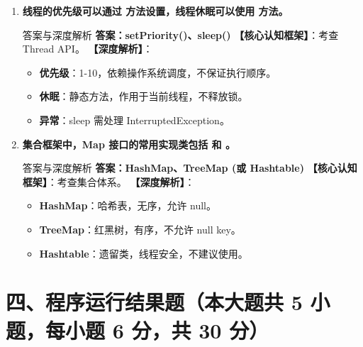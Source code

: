 \documentclass[12pt, a4paper]{ctexart}
\newcommand{\blank}{\underline{\hspace{2cm}}}
\begin{document}
\begin{enumerate}[label=\arabic*.]
	\item \textbf{线程的优先级可以通过 \blank 方法设置，线程休眠可以使用 \blank 方法。}
	      \begin{bluebox}{答案与深度解析}
		      \textbf{答案：setPriority()、sleep()}
		      \textbf{【核心认知框架】}：考查 Thread API。
		      \textbf{【深度解析】}：
		      \begin{itemize}[leftmargin=*, nosep]
			      \item \textbf{优先级}：1-10，依赖操作系统调度，不保证执行顺序。
			      \item \textbf{休眠}：静态方法，作用于当前线程，不释放锁。
			      \item \textbf{异常}：sleep 需处理 InterruptedException。
		      \end{itemize}
	      \end{bluebox}

	\item \textbf{集合框架中，Map 接口的常用实现类包括 \blank 和 \blank。}
	      \begin{bluebox}{答案与深度解析}
		      \textbf{答案：HashMap、TreeMap (或 Hashtable)}
		      \textbf{【核心认知框架】}：考查集合体系。
		      \textbf{【深度解析】}：
		      \begin{itemize}[leftmargin=*, nosep]
			      \item \textbf{HashMap}：哈希表，无序，允许 null。
			      \item \textbf{TreeMap}：红黑树，有序，不允许 null key。
			      \item \textbf{Hashtable}：遗留类，线程安全，不建议使用。
		      \end{itemize}
	      \end{bluebox}
\end{enumerate}

\section*{四、程序运行结果题（本大题共 5 小题，每小题 6 分，共 30 分）}
\end{document}
